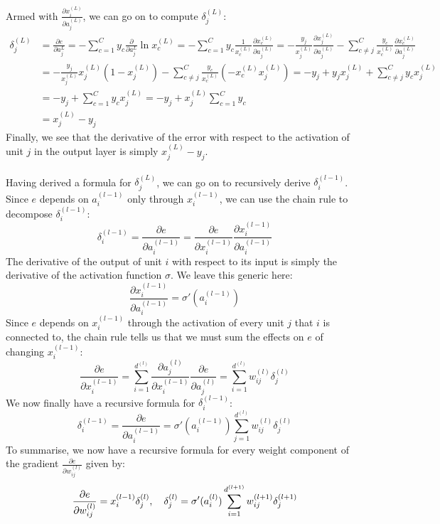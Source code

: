 Armed with $\frac{\partial x^{(L)}_i}{\partial a^{(L)}_j}$, we can go on to compute $\delta^{(L)}_j$:
\begin{align*}
	\delta^{(L)}_j 
	&= \frac{\partial e}{\partial a^{L}_j}
	= - \sum\limits_{c=1}^C y_c \frac{\partial}{\partial a^{L}_j}\ln x^{(L)}_c
	=  - \sum\limits_{c=1}^C y_c \frac{1}{x^{(L)}_c}\frac{\partial x^{(L)}_c}{\partial a^{(L)}_j}
	= - \frac{y_j}{x^{(L)}_j} \frac{\partial x^{(L)}_j}{\partial a^{(L)}_j} - \sum\limits_{c \neq j}^C \frac{y_c}{x^{(L)}_c} \frac{\partial x^{(L)}_c}{\partial a^{(L)}_j}\\
	&= - \frac{y_j}{x^{(L)}_j} x^{(L)}_j(1 - x^{(L)}_j)  - \sum\limits_{c \neq j}^C \frac{y_c}{x^{(L)}_c} (-x^{(L)}_c x^{(L)}_j)
	= - y_j + y_j x^{(L)}_j + \sum\limits_{c \neq j}^C y_c x^{(L)}_j\\
	&= - y_j + \sum\limits_{c = 1}^C y_c x^{(L)}_j
	= - y_j + x^{(L)}_j \sum\limits_{c = 1}^C y_c\\
	&=  x^{(L)}_j - y_j
\end{align*}
Finally, we see that the derivative of the error with respect to the activation of unit $j$ in the output layer is simply $x^{(L)}_j - y_j$.
\\\\
Having derived a formula for $\delta^{(L)}_j$, we can go on to recursively derive $\delta^{(l-1)}_i$. Since $e$ depends on $a^{(l-1)}_i$ only through $x^{(l-1)}_i$, we can use the chain rule to decompose $\delta^{(l-1)}_i$:
$$
\delta^{(l-1)}_i = \frac{\partial e}{\partial a^{(l-1)}_i} = \frac{\partial e}{\partial x^{(l-1)}_i} \frac{\partial x^{(l-1)}_i}{\partial a^{(l-1)}_i}
$$
The derivative of the output of unit $i$ with respect to its input is simply the derivative of the activation function $\sigma$. We leave this generic here:
$$
\frac{\partial x^{(l-1)}_i}{\partial a^{(l-1)}_i} = \sigma'(a^{(l-1)}_i)
$$
Since $e$ depends on $x^{(l-1)}_i$ through the activation of every unit $j$ that $i$ is connected to, the chain rule tells us that we must sum the effects on $e$ of changing $x^{(l-1)}_i$:
$$
\frac{\partial e}{\partial x^{(l-1)}_i} 
= \sum\limits_{i=1}^{d^{(l)}} \frac{\partial a^{(l)}_j}{\partial x^{(l-1)}_i} \frac{\partial e}{\partial a^{(l)}_j}
= \sum\limits_{i=1}^{d^{(l)}} w^{(l)}_{ij} \delta^{(l)}_j
$$
We now finally have a recursive formula for $\delta^{(l-1)}_i$:
$$
\delta^{(l-1)}_i = \frac{\partial e}{\partial a^{(l-1)}_i}
= \sigma'(a^{(l-1)}_i) \sum\limits_{j=1}^{d^{(l)}} w^{(l)}_{ij} \delta^{(l)}_j
$$
To summarise, we now have a recursive formula for every weight component of the gradient $\frac{\partial e}{\partial w^{(l)}_{ij}}$ given by:
$$
\frac{\partial e}{\partial w^{(l)}_{ij}} = x^{(l-1)}_i \delta^{(l)}_j,\quad \delta^{(l)}_j = \sigma'(a^{(l)}_i) \sum\limits_{i=1}^{d^{(l+1)}} w^{(l+1)}_{ij} \delta^{(l+1)}_j
$$

